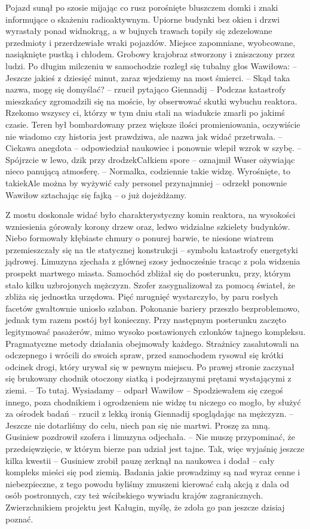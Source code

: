 \documentclass[../MAIN.tex]{subfiles}
\begin{document}
Pojazd sunął po szosie mijając co rusz porośnięte bluszczem domki i znaki informujące o skażeniu radioaktywnym. Upiorne budynki bez okien i drzwi wyrastały ponad widnokrąg, a w bujnych trawach topiły się zdezelowane przedmioty i przerdzewiałe wraki pojazdów. Miejsce zapomniane, wyobcowane, nasiąknięte pustką i chłodem. Grobowy krajobraz stworzony i zniszczony przez ludzi.
Po długim milczeniu w samochodzie rozległ się tubalny głos Wawiłowa: 
-- Jeszcze jakieś z dziesięć minut, zaraz wjedziemy na most śmierci. 
-- Skąd taka nazwa, mogę się domyślać? -- rzucił pytająco Giennadij 
-- Podczas katastrofy mieszkańcy zgromadzili się na moście, by obserwować skutki wybuchu reaktora. Rzekomo wszyscy ci, którzy w tym dniu stali na wiadukcie zmarli po jakimś czasie. Teren był bombardowany przez większe ilości promieniowania, oczywiście nie wiadomo czy historia jest prawdziwa, ale nazwa jak widać przetrwała. 
-- Ciekawa anegdota -- odpowiedział naukowiec i ponownie wlepił wzrok w szybę. 
-- Spójrzcie w lewo, dzik przy drodze\3kCałkiem spore -- oznajmił Wuser ożywiając nieco panującą atmosferę. 
-- Normalka, codziennie takie widzę. Wyrośnięte, to takie\3kAle można by wyżywić cały personel przynajmniej -- odrzekł ponownie Wawiłow sztachając się fajką -- o już dojeżdżamy. 

Z mostu doskonale widać było charakterystyczny komin reaktora, na wysokości wzniesienia górowały korony drzew oraz, ledwo widzialne szkielety budynków. Niebo formowały kłębiaste chmury o ponurej barwie, te niesione wiatrem przemieszczały się na tle statycznej konstrukcji -- symbolu katastrofy energetyki jądrowej. 
Limuzyna zjechała z głównej szosy jednocześnie tracąc z pola widzenia prospekt martwego miasta. Samochód zbliżał się do posterunku, przy, którym stało kilku uzbrojonych mężczyzn. Szofer zasygnalizował za pomocą świateł, że zbliża się jednostka urzędowa. Pięć mrugnięć wystarczyło, by paru rosłych facetów gwałtownie uniosło szlaban. Pokonanie bariery przeszło bezproblemowo, jednak tym razem postój był konieczny. Przy następnym posterunku zaczęto legitymować pasażerów, mimo wysoko postawionych członków tajnego kompleksu. Pragmatyczne metody działania obejmowały każdego. Strażnicy zasalutowali na odczepnego i wrócili do swoich spraw, przed samochodem rysował się krótki odcinek drogi, który urywał się w pewnym miejscu. Po prawej stronie zaczynał się brukowany chodnik otoczony siatką i podejrzanymi prętami wystającymi z ziemi. 
-- To tutaj. Wysiadamy -- odparł Wawiłow 
-- Spodziewałem się czegoś innego, poza chodnikiem i ogrodzeniem nie widzę tu niczego co mogło, by służyć za ośrodek badań -- rzucił z lekką ironią Giennadij spoglądając na mężczyzn. 
-- Jeszcze nie dotarliśmy do celu, niech pan się nie martwi. Proszę za mną. 
Gusiniew pozdrowił szofera i limuzyna odjechała. 
-- Nie muszę przypominać, że przedsięwzięcie, w którym bierze pan udział jest tajne. Tak, więc wyjaśnię jeszcze kilka kwestii -- Gusiniew zrobił pauzę zerknął na naukowca i dodał -- cały kompleks mieści się pod ziemią. Badania jakie prowadzimy są nad wyraz cenne i niebezpieczne, z tego powodu byliśmy zmuszeni kierować całą akcją z dala od osób postronnych, czy też wścibskiego wywiadu krajów zagranicznych. Zwierzchnikiem projektu jest Kaługin, myślę, że zdoła go pan jeszcze dzisiaj poznać.
\end{document}
